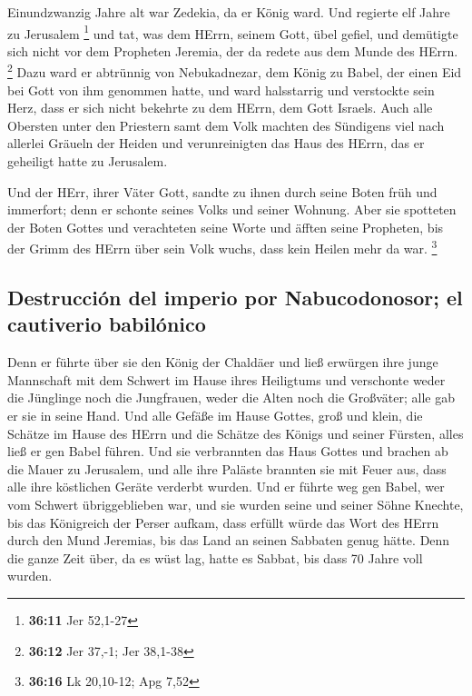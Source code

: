  Einundzwanzig Jahre alt war Zedekia, da er König ward.
Und regierte elf Jahre zu Jerusalem \footnote{\textbf{36:11} Jer 52,1-27}
 und tat, was dem HErrn, seinem Gott, übel gefiel, und
demütigte sich nicht vor dem Propheten Jeremia, der da redete aus dem
Munde des HErrn. \footnote{\textbf{36:12} Jer 37,-1; Jer 38,1-38}
 Dazu ward er abtrünnig von Nebukadnezar, dem König zu
Babel, der einen Eid bei Gott von ihm genommen hatte, und ward
halsstarrig und verstockte sein Herz, dass er sich nicht bekehrte zu dem
HErrn, dem Gott Israels.  Auch alle Obersten unter den
Priestern samt dem Volk machten des Sündigens viel nach allerlei Gräueln
der Heiden und verunreinigten das Haus des HErrn, das er geheiligt hatte
zu Jerusalem.

 Und der HErr, ihrer Väter Gott, sandte zu ihnen durch
seine Boten früh und immerfort; denn er schonte seines Volks und seiner
Wohnung.  Aber sie spotteten der Boten Gottes und
verachteten seine Worte und äfften seine Propheten, bis der Grimm des
HErrn über sein Volk wuchs, dass kein Heilen mehr da war. \footnote{\textbf{36:16}
  Lk 20,10-12; Apg 7,52}

\hypertarget{destrucciuxf3n-del-imperio-por-nabucodonosor-el-cautiverio-babiluxf3nico}{%
\subsection{Destrucción del imperio por Nabucodonosor; el cautiverio
babilónico}\label{destrucciuxf3n-del-imperio-por-nabucodonosor-el-cautiverio-babiluxf3nico}}

 Denn er führte über sie den König der Chaldäer und ließ
erwürgen ihre junge Mannschaft mit dem Schwert im Hause ihres Heiligtums
und verschonte weder die Jünglinge noch die Jungfrauen, weder die Alten
noch die Großväter; alle gab er sie in seine Hand.  Und
alle Gefäße im Hause Gottes, groß und klein, die Schätze im Hause des
HErrn und die Schätze des Königs und seiner Fürsten, alles ließ er gen
Babel führen.  Und sie verbrannten das Haus Gottes und
brachen ab die Mauer zu Jerusalem, und alle ihre Paläste brannten sie
mit Feuer aus, dass alle ihre köstlichen Geräte verderbt wurden.
 Und er führte weg gen Babel, wer vom Schwert
übriggeblieben war, und sie wurden seine und seiner Söhne Knechte, bis
das Königreich der Perser aufkam,  dass erfüllt würde das
Wort des HErrn durch den Mund Jeremias, bis das Land an seinen Sabbaten
genug hätte. Denn die ganze Zeit über, da es wüst lag, hatte es Sabbat,
bis dass 70 Jahre voll wurden.

